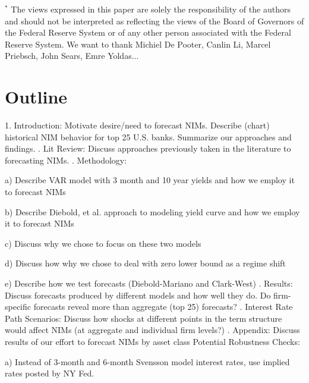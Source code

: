 \documentclass[12pt]{article}
\renewcommand{\baselinestretch}{1.5}
\begin{document}
\vspace{2cm}

{\footnotesize \noindent $^{*}$ The views expressed in this paper are solely
the responsibility of the authors and should not be interpreted as
reflecting the views of the Board of Governors of the Federal Reserve System
or of any other person associated with the Federal Reserve System. We want to thank Michiel De Pooter, Canlin Li, Marcel Priebsch, John Sears, Emre Yoldas... }

\clearpage \renewcommand{\baselinestretch}{1.5} \normalsize

\section{Outline}
1. Introduction: Motivate desire/need to forecast NIMs. Describe (chart) historical NIM behavior for top 25 U.S. banks. Summarize our approaches and findings.
. Lit Review: Discuss approaches previously taken in the literature to forecasting NIMs.
. Methodology: 

    a) Describe VAR model with 3 month and 10 year yields and how we employ it to forecast NIMs
    
    b) Describe Diebold, et al. approach to modeling yield curve and how we employ it to forecast NIMs
    
    c) Discuss why we chose to focus on these two models
    
    d) Discuss how why we chose to deal with zero lower bound as a regime shift
    
    e) Describe how we test forecasts (Diebold-Mariano and Clark-West)
. Results: Discuss forecasts produced by different models and how well they do. Do firm-specific forecasts reveal more than aggregate (top 25) forecasts?
. Interest Rate Path Scenarios: Discuss how shocks at different points in the term structure would affect NIMs (at aggregate and individual firm levels?)
. Appendix: Discuss results of our effort to forecast NIMs by asset class
\newline
Potential Robustness Checks:

    a) Instead of 3-month and 6-month Svensson model interest rates, use implied rates posted by NY Fed.
\end{document}
